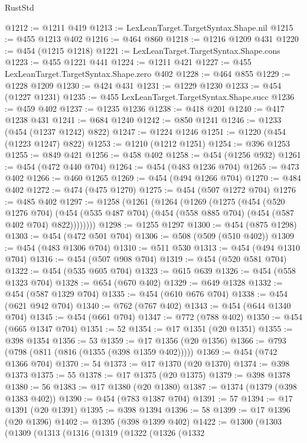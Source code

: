 \begin{lexlean}{RustStd}
\begin{coremodule}
@1212 := @1211 @419
@1213 := LexLeanTarget.TargetSyntax.Shape.nil
@1215 := @455 @1213 @402
@1216 := @464 @860
@1218 := @1216 @1209 @431
@1220 := @454 (@1215 @1218)
@1221 := LexLeanTarget.TargetSyntax.Shape.cons
@1223 := @455 @1221 @441
@1224 := @1211 @421
@1227 := @455 LexLeanTarget.TargetSyntax.Shape.zero @402
@1228 := @464 @855
@1229 := @1228 @1209
@1230 := @424 @431
@1231 := @1229 @1230
@1233 := @454 (@1227 @1231)
@1235 := @455 LexLeanTarget.TargetSyntax.Shape.succ
@1236 := @459 @402
@1237 := @1235 @1236
@1238 := @418 @201
@1240 := @417 @1238 @431
@1241 := @684 @1240
@1242 := @850 @1241
@1246 := @1233 (@454 (@1237 @1242) @822)
@1247 := @1224 @1246
@1251 := @1220 (@454 (@1223 @1247) @822)
@1253 := @1210 (@1212 @1251)
@1254 := @396 @1253
@1255 := @849 @421
@1256 := @458 @402
@1258 := @454 (@1256 @932)
@1261 := @454 (@472 @440 @704)
@1264 := @454 (@483 @1236 @704)
@1265 := @473 @402
@1266 := @460 @1265
@1269 := @454 (@494 @1266 @704)
@1270 := @484 @402
@1272 := @474 (@475 @1270)
@1275 := @454 (@507 @1272 @704)
@1276 := @485 @402
@1297 := @1258
    (@1261
      (@1264
        (@1269
          (@1275
            (@454
              (@520 @1276 @704)
              (@454 (@535 @487 @704) (@454 (@558 @885 @704) (@454 (@587 @402 @704) @822))))))))
@1298 := @1255 @1297
@1300 := @454 (@875 @1298)
@1303 := @454 (@472 @501 @704)
@1306 := @508 (@509 (@510 @402))
@1309 := @454 (@483 @1306 @704)
@1310 := @511 @530
@1313 := @454 (@494 @1310 @704)
@1316 := @454 (@507 @908 @704)
@1319 := @454 (@520 @581 @704)
@1322 := @454 (@535 @605 @704)
@1323 := @615 @639
@1326 := @454 (@558 @1323 @704)
@1328 := @654 (@670 @402)
@1329 := @649 @1328
@1332 := @454 (@587 @1329 @704)
@1335 := @454 (@610 @676 @704)
@1338 := @454 (@621 @942 @704)
@1340 := @762 (@767 @402)
@1343 := @454 (@644 @1340 @704)
@1345 := @454 (@661 @704)
@1347 := @772 (@788 @402)
@1350 := @454 (@665 @1347 @704)
@1351 := 52
@1354 := @17 @1351 (@20 @1351)
@1355 := @398 @1354
@1356 := 53
@1359 := @17 @1356 (@20 @1356)
@1366 := @793 (@798 (@811 (@816 (@1355 (@398 @1359 @402)))))
@1369 := @454 (@742 @1366 @704)
@1370 := 54
@1373 := @17 @1370 (@20 @1370)
@1374 := @398 @1373
@1375 := 55
@1378 := @17 @1375 (@20 @1375)
@1379 := @398 @1378
@1380 := 56
@1383 := @17 @1380 (@20 @1380)
@1387 := @1374 (@1379 (@398 @1383 @402))
@1390 := @454 (@783 @1387 @704)
@1391 := 57
@1394 := @17 @1391 (@20 @1391)
@1395 := @398 @1394
@1396 := 58
@1399 := @17 @1396 (@20 @1396)
@1402 := @1395 (@398 @1399 @402)
@1422 := @1300
    (@1303
      (@1309
        (@1313
          (@1316
            (@1319
              (@1322
                (@1326
                  (@1332

\end{coremodule}
\end{lexlean}
